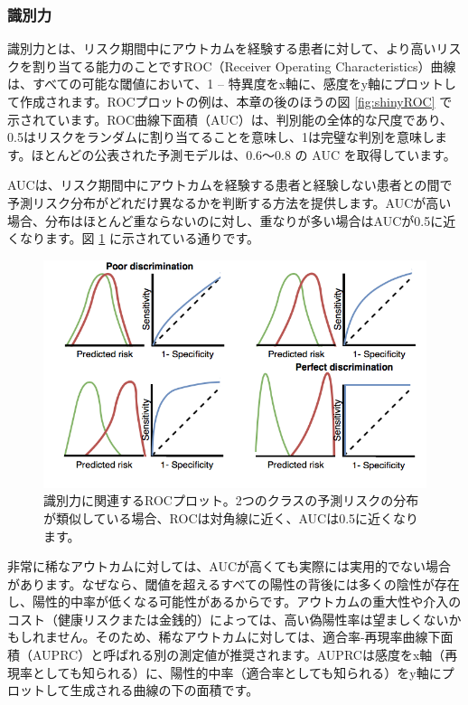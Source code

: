\documentclass[
  11pt]{book}
\theoremstyle{definition}
\theoremstyle{definition}
\theoremstyle{definition}
\theoremstyle{definition}
\theoremstyle{remark}
\begin{document}
\subsubsection*{識別力}\label{ux8b58ux5225ux529b}

識別力とは、リスク期間中にアウトカムを経験する患者に対して、より高いリスクを割り当てる能力のことですROC（Receiver Operating Characteristics）曲線は、すべての可能な閾値において、1 -- 特異度をx軸に、感度をy軸にプロットして作成されます。ROCプロットの例は、本章の後のほうの図 \ref{fig:shinyROC} で示されています。ROC曲線下面積（AUC）は、判別能の全体的な尺度であり、0.5はリスクをランダムに割り当てることを意味し、1は完璧な判別を意味します。ほとんどの公表された予測モデルは、0.6～0.8 の AUC を取得しています。   

AUCは、リスク期間中にアウトカムを経験する患者と経験しない患者との間で予測リスク分布がどれだけ異なるかを判断する方法を提供します。AUCが高い場合、分布はほとんど重ならないのに対し、重なりが多い場合はAUCが0.5に近くなります。図 \ref{fig:figuretheoryroctheory} に示されている通りです。

\begin{figure}
\includegraphics[width=1\linewidth]{images/PatientLevelPrediction/theory/roctheory} \caption{識別力に関連するROCプロット。2つのクラスの予測リスクの分布が類似している場合、ROCは対角線に近く、AUCは0.5に近くなります。}\label{fig:figuretheoryroctheory}
\end{figure}

非常に稀なアウトカムに対しては、AUCが高くても実際には実用的でない場合があります。なぜなら、閾値を超えるすべての陽性の背後には多くの陰性が存在し、陽性的中率が低くなる可能性があるからです。アウトカムの重大性や介入のコスト（健康リスクまたは金銭的）によっては、高い偽陽性率は望ましくないかもしれません。そのため、稀なアウトカムに対しては、適合率-再現率曲線下面積（AUPRC）と呼ばれる別の測定値が推奨されます。AUPRCは感度をx軸（再現率としても知られる）に、陽性的中率（適合率としても知られる）をy軸にプロットして生成される曲線の下の面積です。 
\end{document}
